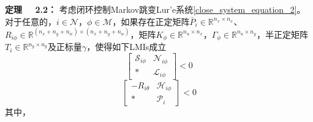 	{\bf 定理 \ \ 2.2：}
	考虑闭环控制Markov跳变Lur'e系统\eqref{close_system_equation_2}。对于任意的，$i\in\mathcal{N}$，$\phi\in\mathcal{M}$，如果存在正定矩阵$\bar{P}_{i}\in\mathbb{R}^{n_x\times n_x}$、$R_{i\phi}\in \mathbb{R}^{(n_x+n_y+n_w)\times(n_x+n_y+n_w)}$，矩阵$K_{\phi}\in\mathbb{R}^{n_u\times n_x}$，$\varGamma_{\phi}\in \mathbb{R}^{n_u\times n_y}$，半正定矩阵$T_{i}\in\mathbb{R}^{n_y\times n_y}$及正标量$\gamma$，使得如下LMIs成立
	\begin{equation} \label{condition_2_2}
	\begin{bmatrix}
	\mathscr{S}_{i\phi}&\mathscr{N}_{i\phi}\\
	*&\mathscr{L}_{i\phi}
	\end{bmatrix}<0
	\end{equation}
	\begin{equation} \label{condition_2_1}
	\begin{bmatrix}
	-R_{i\theta}&\mathscr{H}_{i\phi}\\
	*&\mathscr{P}_{i}
	\end{bmatrix}<0
	\end{equation}
	其中，
